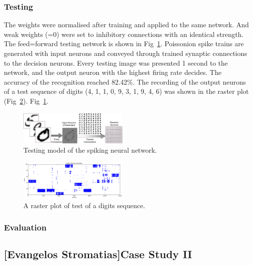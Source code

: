 \subsubsection{Testing}
The weights were normalised after training and applied to the same network.
And weak weights (=0) were set to inhibitory connections with an identical strength.
The feed=forward testing network is shown in Fig~\ref{Fig:test}.
Poissonion spike trains are generated with input neurons and conveyed through trained synaptic connections to the decision neurons.
Every testing image was presented 1 second to the network, and the output neuron with the highest firing rate decides.
The accuracy of the recognition reached 82.42\%.%
The recording of the output neurons of a test sequence of digits (4, 1, 1, 0, 9, 3, 1, 9, 4, 6) was shown in the raster plot (Fig~\ref{Fig:output}).
Fig~\ref{Fig:test}.
\begin{figure}[hbt!]
	\centering
	\includegraphics[width=0.48\textwidth]{images/testing.pdf}
	\caption{Testing model of the spiking neural network.}
	\label{Fig:test}
\end{figure} 
\begin{figure}[hbt!]
	\centering
	\includegraphics[width=0.48\textwidth]{images/test300-301.pdf}
	\caption{A raster plot of test of a digits sequence.}
	\label{Fig:output}
\end{figure} 
\subsubsection{Evaluation}

\subsection{[Evangelos Stromatias]Case Study II}